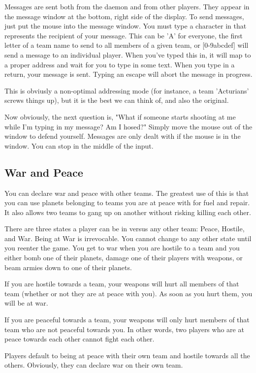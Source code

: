 Messages are sent both from the daemon and from other players.
They appear in the message window at the bottom, right side of the display.
To send messages, just put the mouse into the message window.
You must type a character in that represents the recipient of your
message.  This can be 'A' for everyone,  the first letter of a team name
 to send to all members
of a given team, or [0-9abcdef] will send a message to an individual
player.  When you've typed this in, it will map to a proper address
and wait for you to type in some text.  When you type in a return,
your message is sent.
Typing an escape will abort the message in progress.

This is obviusly a non-optimal addressing mode (for instance, a team 'Acturians'
screws things up), but it is the best we can think of, and also the original.

Now obviously, the next question is, "What if someone starts shooting
at me while I'm typing in my message?  Am I hosed?"
Simply move the mouse out of the window to defend yourself.  Messages
are only dealt with if the mouse is in the window.  You can stop
in the middle of the input.


\subsection{War and Peace}

You can declare war and peace with other teams.
The greatest use of this is that you can use planets belonging
to teams you are at peace with for fuel and repair.
It also allows two teams to gang up on another without risking
killing each other.

There are three states a player can be in versus any other team:
Peace, Hostile, and War.  Being at War is irrevocable.  You cannot
change to any other state until you reenter the game.  You get to
war when you are hostile to a team and you either bomb one of their
planets, damage one of their players with weapons, or beam armies
down to one of their planets.

If you are hostile towards a team, your weapons will hurt all members of
that team (whether or not they are at peace with you).  As soon as
you hurt them, you will be at war.

If you are peaceful towards a team, your weapons will only hurt members
of that team who are not peaceful towards you.  In other words, two
players who are at peace towards each other cannot fight each other.

Players default to being at peace with their own team and hostile
towards all the others.  Obviously, they can declare war on their own
team.

